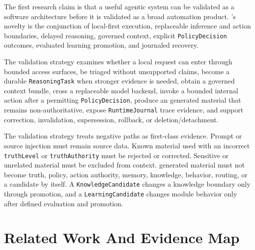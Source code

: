 The first research claim is that a useful agentic system can be validated as a software architecture before it is validated as a broad automation product. \Madre's novelty is the conjunction of local-first execution, replaceable inference and action boundaries, delayed reasoning, governed context, explicit \texttt{PolicyDecision} outcomes, evaluated learning promotion, and journaled recovery.

The validation strategy examines whether a local request can enter through bounded access surfaces, be triaged without unsupported claims, become a durable \texttt{ReasoningTask} when stronger evidence is needed, obtain a governed context bundle, cross a replaceable model backend, invoke a bounded internal action after a permitting \texttt{PolicyDecision}, produce an generated material that remains non-authoritative, expose \texttt{RuntimeJournal} trace evidence, and support correction, invalidation, supersession, rollback, or deletion/detachment.

The validation strategy treats negative paths as first-class evidence. Prompt or source injection must remain source data. Known material used with an incorrect \texttt{truthLevel} or \texttt{truthAuthority} must be rejected or corrected. Sensitive or unrelated material must be excluded from context. generated material must not become truth, policy, action authority, memory, knowledge, behavior, routing, or a candidate by itself. A \texttt{KnowledgeCandidate} changes a knowledge boundary only through promotion, and a \texttt{LearningCandidate} changes module behavior only after defined evaluation and promotion.

\section{Related Work And Evidence Map}

